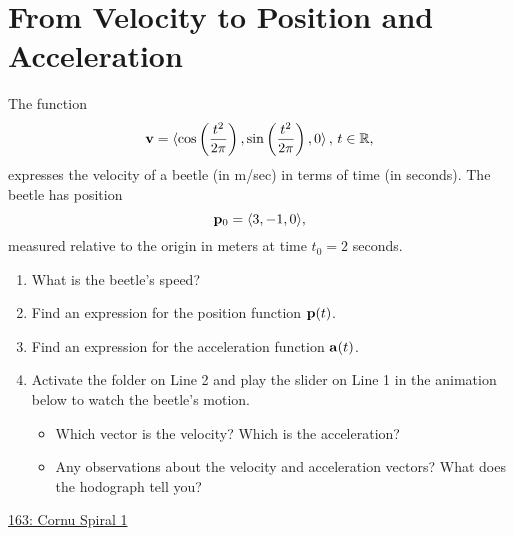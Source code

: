 \documentclass{ximera}
\begin{document}
\section{From Velocity to Position and Acceleration}
\begin{question} \label{Qder44t4tr4tr4}
The function
\[
  {\bf v} = \langle \cos \left( \frac{t^2}{2\pi}  \right) ,  \sin \left( \frac{t^2}{2\pi} \right) , 0 \rangle \, , \, t \in \mathbb{R} ,
\]
expresses the velocity of a beetle (in m/sec) in terms of time (in seconds). The beetle has position
\[
   {\bf p}_0 = \langle 3, -1, 0  \rangle ,
\]
measured relative to the origin in meters at time $t_0 = 2$ seconds.

\begin{enumerate}
\item What is the beetle's speed?


\item Find an expression for the position function ${\bf p}(t)$.

\item Find an expression for the acceleration function ${\bf a}(t)$.

\item Activate the folder on Line 2 and play the slider on Line 1 in the animation below to watch the beetle's motion.

\begin{itemize}
\item Which vector is the velocity? Which is the acceleration?

\item Any observations about the velocity and acceleration vectors? What does the hodograph tell you?

\end{itemize}


\begin{onlineOnly}
    \begin{center}
\end{center}
\end{onlineOnly}


\end{enumerate}
\href{https://www.desmos.com/3d/womvfsqwir}{163: Cornu Spiral 1}

\end{question}
\end{document}
